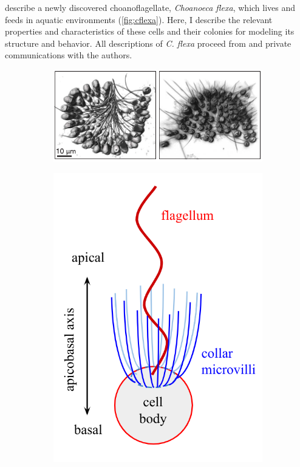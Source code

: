 \citet{brunet2019} describe a newly discovered choanoflagellate, \textit{Choanoeca flexa}, which lives and feeds in aquatic environments (\cref{fig:cflexa}). 
Here, I describe the relevant properties and characteristics of these cells and their colonies for modeling its structure and behavior. 
All descriptions of \textit{C. flexa} proceed from \citet{brunet2019} and private communications with the authors.

\begin{figure}[htbp]
	\centering
	\begin{subfigure}[b]{0.5\textwidth}
		\centering
		\includegraphics[width=\textwidth]{cflexa.png}
		\caption{}
		\label{subfig:cflexa}
	\end{subfigure}
	\begin{subfigure}[b]{0.18\textwidth}
		\centering
		\includegraphics[width=\textwidth]{morphology.png}

\end{subfigure}
\end{figure}
